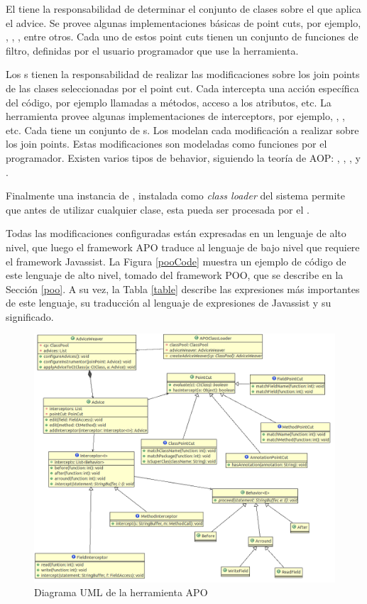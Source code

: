 El  tiene la responsabilidad de determinar el conjunto de
clases sobre el que aplica el advice. Se provee algunas implementaciones básicas
de point cuts, por ejemplo, , , 
, entre otros. Cada uno de estos point cuts tienen un conjunto de funciones
de filtro, definidas por el usuario programador que use la herramienta. 

Los s tienen la responsabilidad de realizar las modificaciones sobre 
los join points de las clases seleccionadas por el point cut. 
Cada  intercepta una acción específica del código, por ejemplo
llamadas a métodos, acceso a los atributos, etc. La herramienta provee algunas implementaciones de interceptors,
por ejemplo, , , etc. 
Cada  tiene un conjunto de s.
Los  modelan cada modificación a realizar sobre los join points. 
Estas modificaciones son modeladas como funciones por el programador.
Existen varios tipos de behavior, siguiendo la teoría de AOP: 
, , ,  y . 
 
Finalmente una instancia de , instalada como \emph{class
loader} del sistema permite que antes de utilizar cualquier clase, esta pueda
ser procesada por el .

Todas las modificaciones configuradas están expresadas en un
lenguaje de alto nivel, que luego el framework APO traduce al lenguaje de bajo nivel que requiere el
framework Javassist.
La Figura \ref{pooCode} muestra un ejemplo de código de este lenguaje de alto nivel,
tomado del framework POO, que se describe en la Sección \ref{poo}.
A su vez, la Tabla \ref{table} describe las expresiones más importantes de este lenguaje, 
su traducción al lenguaje de expresiones de Javassist y su significado.

\begin{figure}[!hp]
	\centering
	\includegraphics[scale=0.4]{img/apo}
	\caption{Diagrama UML de la herramienta APO}
	\label{aopImage}
\end{figure}	 



